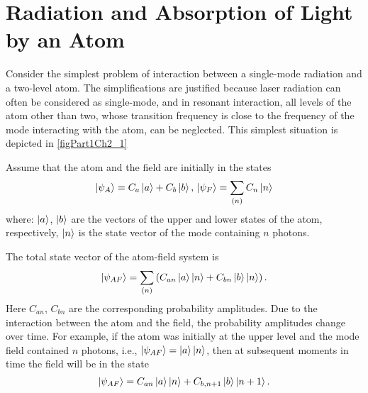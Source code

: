 \section{Radiation and Absorption of Light by an Atom}
Consider the simplest problem of interaction between a single-mode radiation and a two-level atom. The simplifications are justified because laser radiation can often be considered as single-mode, and in resonant interaction, all levels of the atom other than two, whose transition frequency is close to the frequency of the mode interacting with the atom, can be neglected. This simplest situation is depicted in \autoref{figPart1Ch2_1}



Assume that the atom and the field are initially in the states
\begin{equation}
\left|\psi_A\right> = C_a\ket{a} + C_b\ket{b}, \,
\left|\psi_F\right> = \sum_{(n)}C_n\ket{n}
\end{equation}
where: $\ket{a}$, $\ket{b}$ are the vectors of the upper and lower states of the atom, respectively, $\ket{n}$ is the state vector of the mode containing $n$ photons.
  
The total state vector of the atom-field system is
\begin{equation}
\left|\psi_{AF}\right> = \sum_{(n)} 
\left(
C_{an}\ket{a}\ket{n} + 
C_{bn}\ket{b}\ket{n}
\right).
\end{equation}
Here $C_{an}$, $C_{bn}$ are the corresponding probability amplitudes. Due to the interaction between the atom and the field, the probability amplitudes change over time. For example, if the atom was initially at the upper level and the mode field contained $n$ photons, i.e., 
$\left|\psi_{AF}\right> = \ket{a}\ket{n}$,
then at subsequent moments in time the field will be in the state  
\begin{equation}
\left|\psi_{AF}\right> =
C_{an}\ket{a}\ket{n} + 
C_{b,n + 1}\ket{b}\ket{n + 1}.
\label{eq:part1:rabi_solution}
\end{equation}